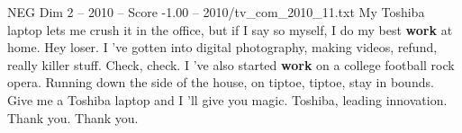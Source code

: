 \begin{textsample}{NEG Dim 2 – 2010 – Score -1.00 – 2010/tv\_com\_2010\_11.txt}  \label{ex:f2_neg_060}
My Toshiba laptop lets me crush it in the office, but if I say so myself, I do my best \textbf{work} at home.
Hey loser.
I 've gotten into digital photography, making videos, refund, really killer stuff.
Check, check.
I 've also started \textbf{work} on a college football rock opera.
Running down the side of the house, on tiptoe, tiptoe, stay in bounds.
Give me a Toshiba laptop and I 'll give you magic.
Toshiba, leading innovation.
Thank you.
Thank you.

\end{textsample}
